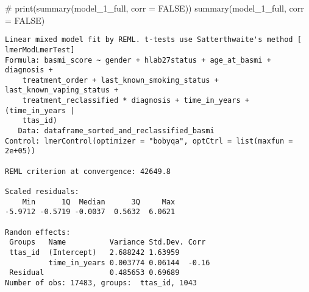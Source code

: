\documentclass[
  letterpaper,
  DIV=11,
  numbers=noendperiod]{scrartcl}
\newenvironment{Shaded}{\begin{snugshade}}{\end{snugshade}}
\newcommand{\AttributeTok}[1]{\textcolor[rgb]{0.40,0.45,0.13}{#1}}
\newcommand{\CommentTok}[1]{\textcolor[rgb]{0.37,0.37,0.37}{#1}}
\newcommand{\ConstantTok}[1]{\textcolor[rgb]{0.56,0.35,0.01}{#1}}
\newcommand{\FunctionTok}[1]{\textcolor[rgb]{0.28,0.35,0.67}{#1}}
\newcommand{\NormalTok}[1]{\textcolor[rgb]{0.00,0.23,0.31}{#1}}
\begin{document}
\begin{Shaded}
\begin{Highlighting}[]
\CommentTok{\# print(summary(model\_1\_full, corr = FALSE))}
\FunctionTok{summary}\NormalTok{(model\_1\_full, }\AttributeTok{corr =} \ConstantTok{FALSE}\NormalTok{)}
\end{Highlighting}
\end{Shaded}

\begin{verbatim}
Linear mixed model fit by REML. t-tests use Satterthwaite's method [
lmerModLmerTest]
Formula: basmi_score ~ gender + hlab27status + age_at_basmi + diagnosis +  
    treatment_order + last_known_smoking_status + last_known_vaping_status +  
    treatment_reclassified * diagnosis + time_in_years + (time_in_years |  
    ttas_id)
   Data: dataframe_sorted_and_reclassified_basmi
Control: lmerControl(optimizer = "bobyqa", optCtrl = list(maxfun = 2e+05))

REML criterion at convergence: 42649.8

Scaled residuals: 
    Min      1Q  Median      3Q     Max 
-5.9712 -0.5719 -0.0037  0.5632  6.0621 

Random effects:
 Groups   Name          Variance Std.Dev. Corr 
 ttas_id  (Intercept)   2.688242 1.63959       
          time_in_years 0.003774 0.06144  -0.16
 Residual               0.485653 0.69689       
Number of obs: 17483, groups:  ttas_id, 1043


\end{verbatim}
\end{document}
